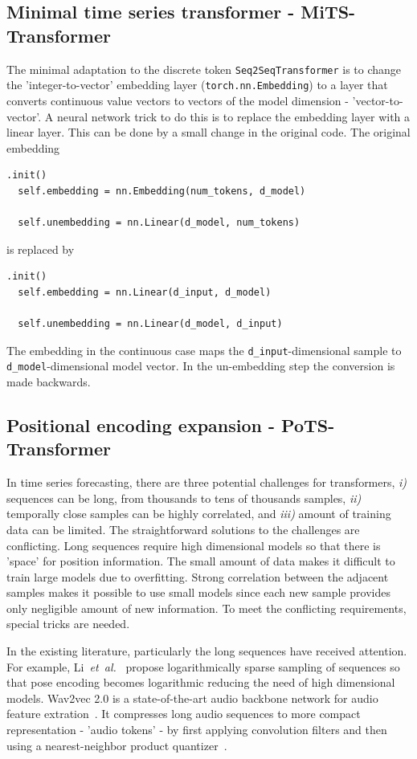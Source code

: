 \documentclass[final]{article}
\begin{document}
%
%
\subsection{Minimal time series transformer - MiTS-Transformer}
\label{sec:minimal}
The minimal adaptation to the discrete token \texttt{Seq2SeqTransformer} is to change the 'integer-to-vector' embedding layer (\texttt{torch.nn.Embedding}) to a layer that converts continuous value vectors to vectors of the model dimension - 'vector-to-vector'. A neural network trick to do this is to replace the embedding layer with a linear layer. This can be done by a small change in the original code. The original embedding
\begin{lstlisting}
.init()
  self.embedding = nn.Embedding(num_tokens, d_model)

  self.unembedding = nn.Linear(d_model, num_tokens)
\end{lstlisting}
is replaced by
\begin{lstlisting}
.init()
  self.embedding = nn.Linear(d_input, d_model)

  self.unembedding = nn.Linear(d_model, d_input)
\end{lstlisting}
The embedding in the continuous case maps the \texttt{d\_input}-dimensional sample to \texttt{d\_model}-dimensional
model vector. In the un-embedding step the conversion is made backwards.

%
%
\subsection{Positional encoding expansion - PoTS-Transformer}
\label{sec:excodat}
In time series forecasting, there are three potential challenges for transformers,
\textit{i)} sequences can be long, from thousands to tens of thousands samples,
\textit{ii)} temporally close samples can be highly correlated, and
\textit{iii)} amount of training data can be limited.
The straightforward solutions to the challenges are conflicting. Long sequences require high dimensional
models so that there is 'space' for position information. The small amount of data makes it difficult to train large models due to overfitting. Strong correlation between the adjacent samples makes it possible to use small models since each new sample provides only negligible amount of new information. To meet the conflicting requirements, special tricks are needed.

In the existing literature, particularly the long sequences have received attention. For example, Li~\textit{et~al.}~\cite{Li-2019-neurips} propose logarithmically sparse sampling of sequences so that pose encoding becomes logarithmic reducing the need of high dimensional models. Wav2vec 2.0 is a state-of-the-art audio backbone network for audio feature extration~\cite{wac2vec2}. It compresses long audio sequences to more compact representation - 'audio tokens' - by first applying convolution filters and then using a nearest-neighbor product quantizer~\cite{Jegou-2011-pami}.
\end{document}
